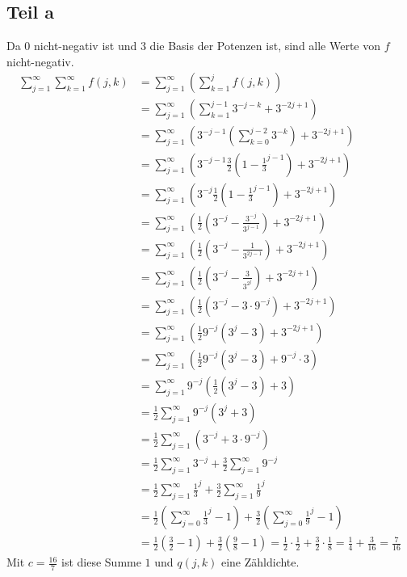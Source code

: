 \documentclass[10pt,a4paper]{article}
\begin{document}
\subsection{Teil a}
Da $0$ nicht-negativ ist und $3$ die Basis der Potenzen ist, sind alle Werte von $f$ nicht-negativ.
\begin{align*}
  \sum_{j = 1}^{\infty} \sum_{k = 1}^{\infty} f(j, k) & = \sum_{j = 1}^{\infty} \left( \sum_{k = 1}^{j} f(j, k) \right)\\
  & = \sum_{j = 1}^{\infty} \left( \sum_{k = 1}^{j - 1} 3^{-j -k} + 3^{-2j + 1} \right)\\
  & = \sum_{j = 1}^{\infty} \left( 3^{-j - 1} \left( \sum_{k = 0}^{j - 2} 3^{-k} \right) + 3^{-2j + 1} \right)\\
  & = \sum_{j = 1}^{\infty} \left( 3^{-j - 1} \frac{3}{2} \left( 1 - \frac{1}{3}^{j - 1} \right) + 3^{-2j + 1} \right)\\
  & = \sum_{j = 1}^{\infty} \left( 3^{-j} \frac{1}{2} \left( 1 - \frac{1}{3}^{j - 1} \right) + 3^{-2j + 1} \right)\\
  & = \sum_{j = 1}^{\infty} \left( \frac{1}{2} \left( 3^{-j} - \frac{3^{-j}}{3^{j - 1}} \right) + 3^{-2j + 1} \right)\\
  & = \sum_{j = 1}^{\infty} \left( \frac{1}{2} \left( 3^{-j} - \frac{1}{3^{2j - 1}} \right) + 3^{-2j + 1} \right)\\
  & = \sum_{j = 1}^{\infty} \left( \frac{1}{2} \left( 3^{-j} - \frac{3}{3^{2^{j}}} \right) + 3^{-2j + 1} \right)\\
  & = \sum_{j = 1}^{\infty} \left( \frac{1}{2} \left( 3^{-j} - 3 \cdot 9^{-j} \right) + 3^{-2j + 1} \right)\\
  & = \sum_{j = 1}^{\infty} \left( \frac{1}{2} 9^{-j} \left( 3^{j} - 3 \right) + 3^{-2j + 1} \right)\\
  & = \sum_{j = 1}^{\infty} \left( \frac{1}{2} 9^{-j} \left( 3^{j} - 3 \right) + 9^{-j} \cdot 3 \right)\\
  & = \sum_{j = 1}^{\infty} 9^{-j} \left( \frac{1}{2} \left( 3^{j} - 3 \right) + 3 \right)\\
  & = \frac{1}{2} \sum_{j = 1}^{\infty} 9^{-j} \left( 3^{j} + 3 \right)\\
  & = \frac{1}{2} \sum_{j = 1}^{\infty} \left( 3^{-j} + 3 \cdot 9^{-j} \right)\\
  & = \frac{1}{2} \sum_{j = 1}^{\infty} 3^{-j} + \frac{3}{2} \sum_{j = 1}^{\infty} 9^{-j}\\
  & = \frac{1}{2} \sum_{j = 1}^{\infty} \frac{1}{3}^{j} + \frac{3}{2} \sum_{j = 1}^{\infty} \frac{1}{9}^{j}\\
  & = \frac{1}{2} \left( \sum_{j = 0}^{\infty} \frac{1}{3}^{j} - 1 \right) + \frac{3}{2} \left( \sum_{j = 0}^{\infty} \frac{1}{9}^{j} - 1\right)\\
  & = \frac{1}{2} \left( \frac{3}{2} - 1 \right) + \frac{3}{2} \left( \frac{9}{8} - 1\right) = \frac{1}{2} \cdot \frac{1}{2} + \frac{3}{2} \cdot \frac{1}{8} = \frac{1}{4} + \frac{3}{16} = \frac{7}{16}
\end{align*}
Mit $c = \frac{16}{7}$ ist diese Summe $1$ und $q(j, k)$ eine Zähldichte.
\end{document}
